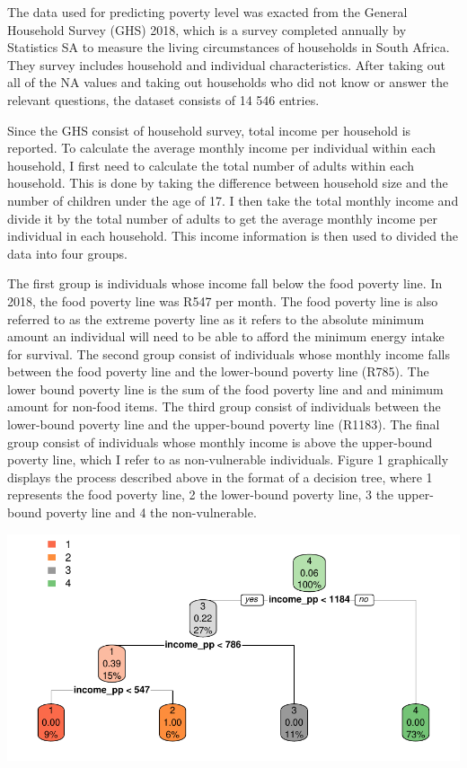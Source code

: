\documentclass[11pt,preprint, authoryear]{elsarticle}
\let\origfigure\figure
\let\endorigfigure\endfigure
\renewenvironment{figure}[1][2] {
    \expandafter\origfigure\expandafter[H]
} {
    \endorigfigure
}
\numberwithin{equation}{section}
\numberwithin{figure}{section}
\numberwithin{table}{section}
\begin{document}
The data used for predicting poverty level was exacted from the General
Household Survey (GHS) 2018, which is a survey completed annually by
Statistics SA to measure the living circumstances of households in South
Africa. They survey includes household and individual characteristics.
After taking out all of the NA values and taking out households who did
not know or answer the relevant questions, the dataset consists of 14
546 entries.

Since the GHS consist of household survey, total income per household is
reported. To calculate the average monthly income per individual within
each household, I first need to calculate the total number of adults
within each household. This is done by taking the difference between
household size and the number of children under the age of 17. I then
take the total monthly income and divide it by the total number of
adults to get the average monthly income per individual in each
household. This income information is then used to divided the data into
four groups.

The first group is individuals whose income fall below the food poverty
line. In 2018, the food poverty line was R547 per month. The food
poverty line is also referred to as the extreme poverty line as it
refers to the absolute minimum amount an individual will need to be able
to afford the minimum energy intake for survival. The second group
consist of individuals whose monthly income falls between the food
poverty line and the lower-bound poverty line (R785). The lower bound
poverty line is the sum of the food poverty line and and minimum amount
for non-food items. The third group consist of individuals between the
lower-bound poverty line and the upper-bound poverty line (R1183). The
final group consist of individuals whose monthly income is above the
upper-bound poverty line, which I refer to as non-vulnerable
individuals. Figure 1 graphically displays the process described above
in the format of a decision tree, where 1 represents the food poverty
line, 2 the lower-bound poverty line, 3 the upper-bound poverty line and
4 the non-vulnerable.

\begin{figure}[H]

{\centering \includegraphics{Predicting-Poverty_files/figure-latex/Figure1-1} 

}

\caption{Decision tree for poverty levels \label{Figure1}}\label{fig:Figure1}
\end{figure}
\end{document}
